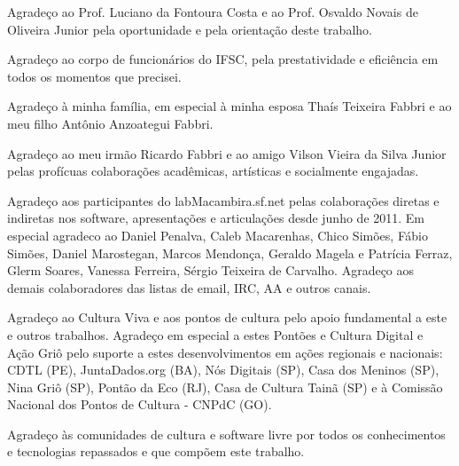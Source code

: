 

Agradeço ao Prof. Luciano da Fontoura Costa e ao Prof. Osvaldo Novais de Oliveira Junior pela oportunidade e pela orientação deste trabalho.

\vspace{4 mm}

Agradeço ao corpo de funcionários do IFSC, pela prestatividade e eficiência em todos os momentos que precisei.

\vspace{4 mm}

Agradeço à minha família, em especial à minha esposa Thaís Teixeira Fabbri e ao meu filho Antônio Anzoategui Fabbri.

\vspace{4 mm}

Agradeço ao meu irmão Ricardo Fabbri e ao amigo Vilson Vieira da Silva Junior pelas profícuas colaborações acadêmicas, artísticas e socialmente engajadas.


\vspace{4 mm}

Agradeço aos participantes do labMacambira.sf.net pelas colaborações diretas e indiretas nos software, apresentações e articulações desde junho de 2011. Em especial agradeco ao Daniel Penalva, Caleb Macarenhas, Chico Simões, Fábio Simões, Daniel Marostegan, Marcos Mendonça, Geraldo Magela e Patrícia Ferraz, Glerm Soares, Vanessa Ferreira, Sérgio Teixeira de Carvalho. Agradeço aos demais colaboradores das listas de email, IRC, AA e outros canais.


\vspace{4 mm}

Agradeço ao Cultura Viva e aos pontos de cultura pelo apoio fundamental a este e outros trabalhos. Agradeço em especial a estes Pontões e Cultura Digital e Ação Griô pelo suporte a estes desenvolvimentos em ações regionais e nacionais: CDTL (PE), JuntaDados.org (BA), Nós Digitais (SP), Casa dos Meninos (SP), Nina Griô (SP), Pontão da Eco (RJ), Casa de Cultura Tainã (SP) e à Comissão Nacional dos Pontos de Cultura - CNPdC (GO).







\vspace{4 mm}

Agradeço às comunidades de cultura e software livre por todos os conhecimentos e tecnologias repassados e que compõem este trabalho. 





